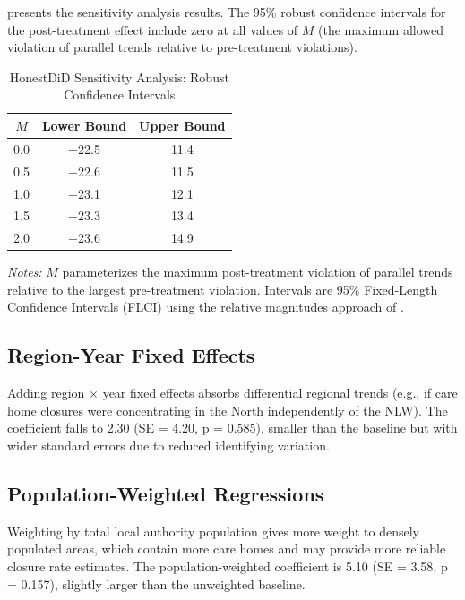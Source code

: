 \documentclass[12pt]{article}
\begin{document}
 presents the \citet{rambachan2023more} sensitivity analysis results. The 95\% robust confidence intervals for the post-treatment effect include zero at all values of $M$ (the maximum allowed violation of parallel trends relative to pre-treatment violations).

\begin{table}[H]
\centering
\begin{threeparttable}
\caption{HonestDiD Sensitivity Analysis: Robust Confidence Intervals}
\label{tab:honestdid}
\begin{tabular}{ccc}
\toprule
$M$ & Lower Bound & Upper Bound \\
\midrule
0.0 & $-$22.5 & 11.4 \\
0.5 & $-$22.6 & 11.5 \\
1.0 & $-$23.1 & 12.1 \\
1.5 & $-$23.3 & 13.4 \\
2.0 & $-$23.6 & 14.9 \\
\bottomrule
\end{tabular}
\begin{tablenotes}
\small
\item \textit{Notes:} $M$ parameterizes the maximum post-treatment violation of parallel trends relative to the largest pre-treatment violation. Intervals are 95\% Fixed-Length Confidence Intervals (FLCI) using the relative magnitudes approach of \citet{rambachan2023more}.
\end{tablenotes}
\end{threeparttable}
\end{table}

\subsection{Region-Year Fixed Effects}

Adding region $\times$ year fixed effects absorbs differential regional trends (e.g., if care home closures were concentrating in the North independently of the NLW). The coefficient falls to 2.30 (SE = 4.20, p = 0.585), smaller than the baseline but with wider standard errors due to reduced identifying variation.

\subsection{Population-Weighted Regressions}

Weighting by total local authority population gives more weight to densely populated areas, which contain more care homes and may provide more reliable closure rate estimates. The population-weighted coefficient is 5.10 (SE = 3.58, p = 0.157), slightly larger than the unweighted baseline.
\end{document}
